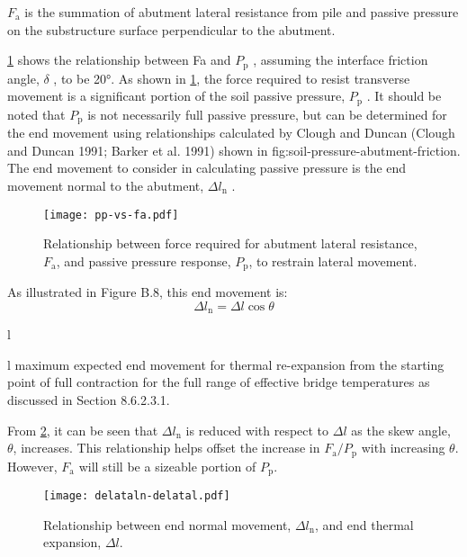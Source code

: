 $F_\text{a}$ is the summation of abutment lateral resistance from pile and passive pressure on the substructure surface perpendicular to the abutment.

\cref{fig:pp-vs-fa} shows the relationship between Fa and $P_\text{p}$ , assuming the interface friction angle, $\delta$ , to be \ang{20}. As shown in \cref{fig:pp-vs-fa}, the force required to resist transverse movement is a significant portion of the soil passive pressure, $P_\text{p}$ . It should be noted that $P_\text{p}$ is not necessarily full passive pressure, but can be determined for the end movement using relationships calculated by Clough and Duncan (Clough and Duncan 1991; Barker et al. 1991) shown in {fig:soil-pressure-abutment-friction}. The end movement to consider in calculating passive pressure is the end movement normal to the abutment, $\Delta l_\text{n}$ .


\begin{figure}
  \texttt{[image: pp-vs-fa.pdf]}
  \caption{Relationship between force required for abutment lateral resistance, $F_\text{a}$, and passive pressure response, $P_\text{p}$, to restrain lateral movement.}
  \label{fig:pp-vs-fa}
\end{figure}

As illustrated in Figure B.8, this end movement is:
\begin{equation}
  \Delta l_\text{n} =  \Delta l \cos\theta
\end{equation}
\begin{EqDesc}{\Delta l}
  \item[\Delta l] maximum expected end movement for thermal re-expansion from the starting point of full contraction for the full range of effective bridge temperatures as discussed in Section 8.6.2.3.1.
\end{EqDesc}


From \cref{fig:delataln-delatal}, it can be seen that $\Delta l_\text{n}$ is reduced with respect to $\Delta l$ as the skew angle, $\theta$, increases. This relationship helps offset the increase in $F_\text{a}/P_\text{p}$ with increasing $\theta$. However, $F_\text{a}$ will still be a sizeable portion of $P_\text{p}$.

\begin{figure}
  \texttt{[image: delataln-delatal.pdf]}
  \caption{Relationship between end normal movement, $\Delta l_\text{n}$, and end thermal expansion, $\Delta l$.}
  \label{fig:delataln-delatal}
\end{figure}

